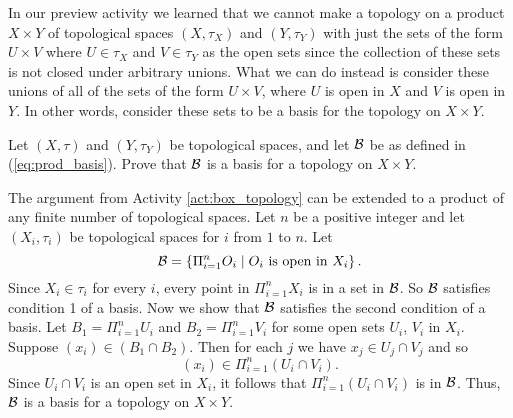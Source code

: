  \label{sec_top_prod_space}

In our preview activity we learned that we cannot make a topology on a product $X \times Y$ of topological spaces $(X, \tau_X)$ and $(Y , \tau_Y)$ with just the sets of the form $U \times V$ where $U \in \tau_X$ and $V \in \tau_Y$ as the open sets since the collection of these sets is not closed under arbitrary unions. What we can do instead is consider these unions of all of the sets of the form $U \times V$, where $U$ is open in $X$ and $V$ is open in $Y$. In other words, consider these sets to be a basis for the topology on $X \times Y$. 

\begin{activity} \label{act:box_topology} Let $(X, \tau)$ and $(Y, \tau_Y)$ be topological spaces, and let $\mathcal{B}$ be as defined in (\ref{eq:prod_basis}). Prove that $\mathcal{B}$ is a basis for a topology on $X \times Y$.

\end{activity}

\begin{comment}

\ActivitySolution Since $X \in \tau_X$ and $Y \in \tau_Y$, every point in $X \times Y$ is in a set in $\CB$. So $\CB$ satisfies condition 1 of a basis. Suppose $(x,y) \in (U_1 \times V_1) \cap (U_2 \times V_2)$. Then $x \in U_1 \cap U_2$ and $y \in V_1 \cap V_2$, and 
\[(x,y) \in (U_1 \cap U_2) \times (V_1 \cap V_2) \subseteq (U_1 \times V_1) \cap (U_2 \times V_2).\]
So $\CB$ is a basis for a topology on $X \times Y$. 

\end{comment}

The argument from Activity \ref{act:box_topology} can be extended to a product of any finite number of topological spaces. Let $n$ be a positive integer and let $(X_i, \tau_i)$ be topological spaces for $i$ from $1$ to $n$. Let 
\[\mathcal{B} = \left\{ \Pi_{i=1}^n O_i \mid O_i \text{ is open in } X_i\right\}.\]
 Since $X_i \in \tau_i$ for every $i$, every point in $\Pi_{i=1}^n X_i$ is in a set in $\mathcal{B}$. So $\mathcal{B}$ satisfies condition 1 of a basis. Now we show that $\mathcal{B}$ satisfies the second condition of a basis.  Let $B_1 = \Pi_{i=1}^n U_i$ and $B_2 = \Pi_{i=1}^n V_i$ for some open sets $U_i$, $V_i$ in $X_i$. Suppose $(x_i) \in (B_1 \cap B_2)$. Then for each $j$ we have $x_j \in U_j \cap V_j$ and so
\[(x_i) \in \Pi_{i=1}^n (U_i \cap V_i).\]
Since $U_i \cap V_i$ is an open set in $X_i$, it follows that $\Pi_{i=1}^n (U_i \cap V_i)$ is in $\mathcal{B}$. Thus, $\mathcal{B}$ is a basis for a topology on $X \times Y$. 

